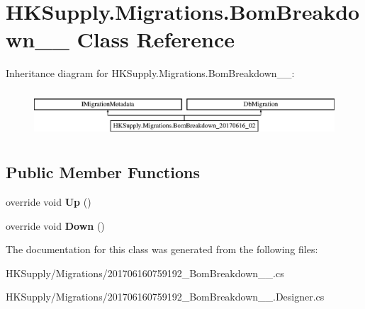 \hypertarget{class_h_k_supply_1_1_migrations_1_1_bom_breakdown__20170616__02}{}\section{H\+K\+Supply.\+Migrations.\+Bom\+Breakdown\+\_\+\_ Class Reference}
\label{class_h_k_supply_1_1_migrations_1_1_bom_breakdown__20170616__02}
Inheritance diagram for H\+K\+Supply.\+Migrations.\+Bom\+Breakdown\+\_\+\_\+:\begin{figure}[H]
\begin{center}
\leavevmode
\includegraphics[height=1.783440cm]{class_h_k_supply_1_1_migrations_1_1_bom_breakdown__20170616__02}
\end{center}
\end{figure}
\subsection*{Public Member Functions}
\begin{DoxyCompactItemize}
\item 
\mbox{\label{class_h_k_supply_1_1_migrations_1_1_bom_breakdown__20170616__02_a35af0772dc3419ceabee04e0d77c648a}} 
override void {\bfseries Up} ()
\item 
\mbox{\label{class_h_k_supply_1_1_migrations_1_1_bom_breakdown__20170616__02_adfc9d82375eb68b27320f43d22e9c8da}} 
override void {\bfseries Down} ()
\end{DoxyCompactItemize}


The documentation for this class was generated from the following files\+:\begin{DoxyCompactItemize}
\item 
H\+K\+Supply/\+Migrations/201706160759192\+\_\+\+Bom\+Breakdown\+\_\+\_.\+cs\item 
H\+K\+Supply/\+Migrations/201706160759192\+\_\+\+Bom\+Breakdown\+\_\+\_.\+Designer.\+cs\end{DoxyCompactItemize}
